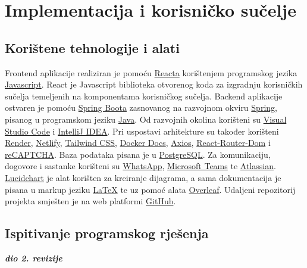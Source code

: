 \chapter{Implementacija i korisničko sučelje}
		
		
		\section{Korištene tehnologije i alati}
		
			Frontend aplikacije realiziran je pomoću \href{https://reactjs.org}{Reacta} korištenjem programskog jezika \href{https://www.javascript.com/}{Javascript}.  React je Javascript biblioteka otvorenog koda za izgradnju korisničkih sučelja temeljenih na komponentama korisničkog sučelja. Backend aplikacije ostvaren je pomoću \href{https://spring.io/projects/spring-boot/}{Spring Boota} zasnovanog na razvojnom okviru \href{https://spring.io}{Spring}, pisanog u programskom jeziku \href{https://www.java.com/en/}{Java}. Od razvojnih okolina korišteni su \href{https://code.visualstudio.com/}{Visual Studio Code} i \href{https://www.jetbrains.com/idea/}{IntelliJ IDEA}. Pri uspostavi arhitekture su također korišteni \href{https://render.com/}{Render}, \href{https://www.netlify.com/}{Netlify}, \href{https://tailwindcss.com/}{Tailwind CSS}, \href{https://docs.docker.com}{Docker Docs}, \href{https://axios-http.com/}{Axios}, \href{https://reactrouter.com/en/main}{React-Router-Dom} i \href{https://www.google.com/recaptcha/}{reCAPTCHA}. Baza podataka pisana je u \href{https://www.postgresql.org/}{PostgreSQL}. Za komunikaciju, dogovore i sastanke korišteni su \href{https://web.whatsapp.com/}{WhatsApp}, \href{https://www.microsoft.com/en-us/microsoft-teams/log-in}{Microsoft Teams} te \href{https://start.atlassian.com/}{Atlassian}. \href{https://www.lucidchart.com/pages/}{Lucidchart} je alat korišten za kreiranje dijagrama, a sama dokumentacija je pisana u markup jeziku \href{https://www.latex-project.org}{LaTeX} te uz pomoć alata \href{https://www.overleaf.com/}{Overleaf}. Udaljeni repozitorij projekta smješten je na web platformi \href{https://github.com/}{GitHub}.
			
			
			\eject 
		
	
		\section{Ispitivanje programskog rješenja}
			
			\textbf{\textit{dio 2. revizije}}\\
			
